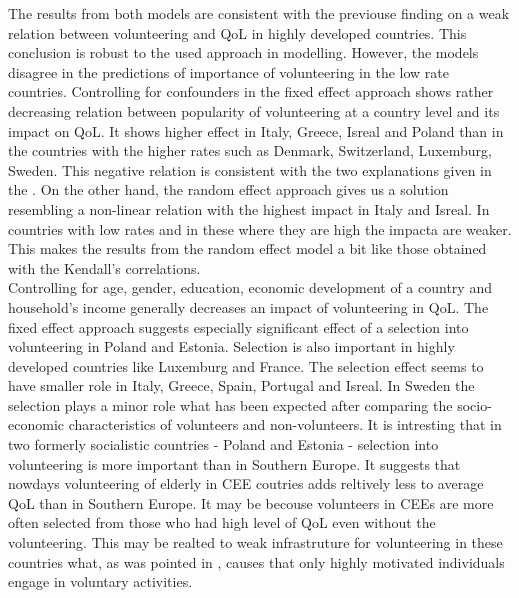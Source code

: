 \documentclass[10pt, letterpaper]{article}
\begin{document}
\begin{spacing}{1.4}
The results from both models are consistent with the previouse finding on a weak relation between volunteering and QoL in highly developed countries. This conclusion is robust to the used approach in modelling. However, the models disagree in the  predictions of importance of volunteering in the low rate countries. Controlling for confounders in the fixed effect approach shows rather decreasing relation between popularity of volunteering at a country level and its impact on QoL.  It shows higher effect in Italy, Greece, Isreal and Poland than in the countries with the higher rates such as Denmark, Switzerland, Luxemburg, Sweden. This negative relation is consistent with the two explanations given in the \citet{haski09}. On the other hand, the random effect approach gives us a solution resembling a non-linear relation with the highest impact in Italy and Isreal. In countries with low rates and in these where they are high the impacta are weaker. This makes the results from the random effect model a bit like those obtained with the Kendall's correlations. \\

Controlling for age, gender, education, economic development of a country and household's income generally decreases an impact of volunteering in QoL. The fixed effect approach suggests especially significant effect of a selection into volunteering in Poland and Estonia. Selection is also important in highly developed countries like Luxemburg and France. The selection effect seems to have smaller role in Italy, Greece, Spain, Portugal and Isreal. In Sweden the selection plays a minor role what has been expected after comparing the socio-economic characteristics of volunteers and non-volunteers. It is intresting that in two formerly socialistic countries - Poland and Estonia - selection into volunteering is more important than in Southern Europe. It suggests that nowdays volunteering of elderly in CEE coutries adds reltively less to average QoL  than in Southern Europe. It may be becouse volunteers in CEEs are more often selected from those who had high level of QoL even without the volunteering. This may be realted to weak infrastruture for volunteering in these countries what, as was pointed in \citet{plagnol10}, causes that only highly motivated individuals engage in voluntary activities. \\ 


   

\end{spacing}
\end{document}
